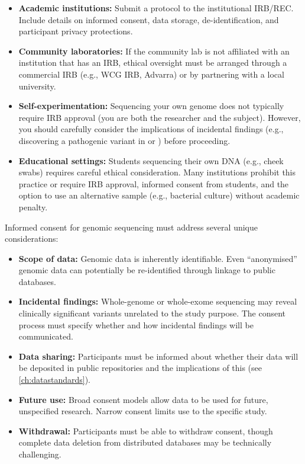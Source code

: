 \begin{itemize}[itemsep=2pt]
  \item \textbf{Academic institutions:} Submit a protocol to the institutional IRB/REC. Include details on informed consent, data storage, de-identification, and participant privacy protections.
  \item \textbf{Community laboratories:} If the community lab is not affiliated with an institution that has an IRB, ethical oversight must be arranged through a commercial IRB (e.g., WCG IRB, Advarra) or by partnering with a local university.
  \item \textbf{Self-experimentation:} Sequencing your own genome does not typically require IRB approval (you are both the researcher and the subject). However, you should carefully consider the implications of incidental findings (e.g., discovering a pathogenic variant in  or ) before proceeding.
  \item \textbf{Educational settings:} Students sequencing their own DNA (e.g., cheek swabs) requires careful ethical consideration. Many institutions prohibit this practice or require IRB approval, informed consent from students, and the option to use an alternative sample (e.g., bacterial culture) without academic penalty.
\end{itemize}

\begin{keyconcept}[title={Informed Consent for Genomic Studies}]
Informed consent for genomic sequencing must address several unique considerations:
\begin{itemize}[nosep]
  \item \textbf{Scope of data:} Genomic data is inherently identifiable. Even ``anonymised'' genomic data can potentially be re-identified through linkage to public databases.
  \item \textbf{Incidental findings:} Whole-genome or whole-exome sequencing may reveal clinically significant variants unrelated to the study purpose. The consent process must specify whether and how incidental findings will be communicated.
  \item \textbf{Data sharing:} Participants must be informed about whether their data will be deposited in public repositories and the implications of this (see \cref{ch:datastandards}).
  \item \textbf{Future use:} Broad consent models allow data to be used for future, unspecified research. Narrow consent limits use to the specific study.
  \item \textbf{Withdrawal:} Participants must be able to withdraw consent, though complete data deletion from distributed databases may be technically challenging.
\end{itemize}
\end{keyconcept}

